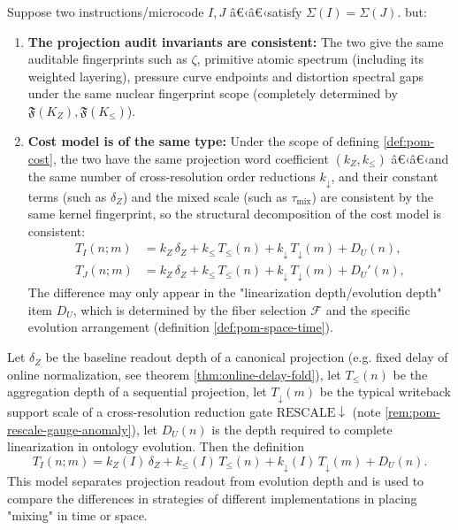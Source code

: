 \begin{proposition}\label{prop:pom-signature-audit}
Suppose two instructions/microcode $I,J$ â€‹â€‹satisfy $\Sigma(I)=\Sigma(J)$. but:
\begin{enumerate}
  \item \textbf{The projection audit invariants are consistent:} The two give the same auditable fingerprints such as $\zeta$, primitive atomic spectrum (including its weighted layering), pressure curve endpoints and distortion spectral gaps under the same nuclear fingerprint scope (completely determined by $\mathfrak{F}(K_Z),\mathfrak{F}(K_{\le})$).
  \item \textbf{Cost model is of the same type:} Under the scope of defining \ref{def:pom-cost}, the two have the same projection word coefficient $(k_Z,k_{\le})$ â€‹â€‹and the same number of cross-resolution order reductions $k_{\downarrow}$, and their constant terms (such as $\delta_Z$) and the mixed scale (such as $\tau_{\mathrm{mix}}$) are consistent by the same kernel fingerprint, so the structural decomposition of the cost model is consistent:
  $$
  \begin{aligned}
  T_I(n;m)&=k_Z\,\delta_Z+k_{\le}\,T_{\le}(n)+k_{\downarrow}\,T_{\downarrow}(m)+D_U(n),\\
  T_J(n;m)&=k_Z\,\delta_Z+k_{\le}\,T_{\le}(n)+k_{\downarrow}\,T_{\downarrow}(m)+D_U'(n),
  \end{aligned}
  $$
  The difference may only appear in the "linearization depth/evolution depth" item $D_U$, which is determined by the fiber selection $\mathcal{F}$ and the specific evolution arrangement (definition \ref{def:pom-space-time}).
\end{enumerate}
\end{proposition}

\begin{definition}\label{def:pom-cost}
Let $\delta_Z$ be the baseline readout depth of a canonical projection (e.g. fixed delay of online normalization, see theorem \ref{thm:online-delay-fold}), let $T_{\le}(n)$ be the aggregation depth of a sequential projection, let $T_{\downarrow}(m)$ be the typical writeback support scale of a cross-resolution reduction gate $\mathrm{RESCALE}\downarrow$ (note \ref{rem:pom-rescale-gauge-anomaly}), let $D_U(n)$ is the depth required to complete linearization in ontology evolution. Then the definition
\[
T_I(n;m)=k_Z(I)\,\delta_Z+k_{\le}(I)\,T_{\le}(n)+k_{\downarrow}(I)\,T_{\downarrow}(m)+D_U(n).
\]
This model separates projection readout from evolution depth and is used to compare the differences in strategies of different implementations in placing "mixing" in time or space.
\end{definition}

